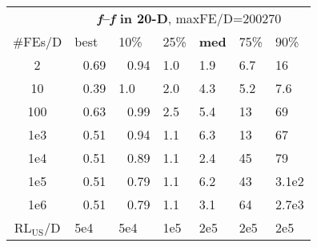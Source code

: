 \begin{tabular}{c|llllll}
 & \multicolumn{6}{|c}{\textbf{\textit{f}\raisebox{-0.35ex}{1}--\textit{f}\raisebox{-0.35ex}{24} in 20-D}, maxFE/D=200270}\\
\#FEs/D & best & 10\% & 25\% & \textbf{med} & 75\% & 90\%\\
2 & ~\,0.69 & ~\,0.94 & \hspace*{1ex}1.0 & \hspace*{1ex}1.9 & \hspace*{1ex}6.7 & 16\\
10 & ~\,0.39 & \hspace*{1ex}1.0 & \hspace*{1ex}2.0 & \hspace*{1ex}4.3 & \hspace*{1ex}5.2 & \hspace*{1ex}7.6\\
100 & ~\,0.63 & ~\,0.99 & \hspace*{1ex}2.5 & \hspace*{1ex}5.4 & 13 & 69\\
1e3 & ~\,0.51 & ~\,0.94 & \hspace*{1ex}1.1 & \hspace*{1ex}6.3 & 13 & 67\\
1e4 & ~\,0.51 & ~\,0.89 & \hspace*{1ex}1.1 & \hspace*{1ex}2.4 & 45 & 79\\
1e5 & ~\,0.51 & ~\,0.79 & \hspace*{1ex}1.1 & \hspace*{1ex}6.2 & 43 & 3.1e2\\
1e6 & ~\,0.51 & ~\,0.79 & \hspace*{1ex}1.1 & \hspace*{1ex}3.1 & 64 & 2.7e3\\
$\text{RL}_{\text{US}}$/D & 5e4 & 5e4 & 1e5 & 2e5 & 2e5 & 2e5
\end{tabular}
